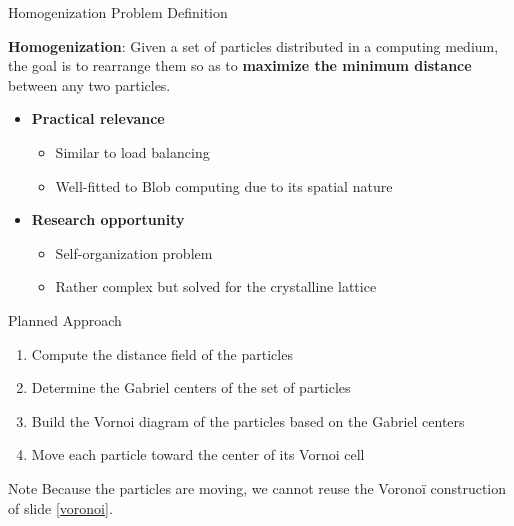 \documentclass{beamer}
\begin{document}
\begin{frame}{Homogenization Problem Definition}
    \begin{definition}
        \textbf{Homogenization}: Given a set of particles distributed in a computing medium, the goal is to rearrange them so as to \textbf{maximize the minimum distance} between any two particles.
    \end{definition}

    \begin{itemize}
        \item \textbf{Practical relevance}
            \begin{itemize}
                \item Similar to load balancing
                \item Well-fitted to Blob computing due to its spatial nature
            \end{itemize}
        
        \item \textbf{Research opportunity}
            \begin{itemize}
                \item Self-organization problem
                \item Rather complex but solved for the crystalline lattice
            \end{itemize}
    \end{itemize}
\end{frame}

\begin{frame}{Planned Approach}
    \begin{enumerate}
        \item Compute the distance field of the particles
        \item Determine the Gabriel centers of the set of particles
        \item Build the Vornoi diagram of the particles based on the Gabriel centers
        \item Move each particle toward the center of its Vornoi cell
    \end{enumerate}

    \vfill

    \begin{block}{Note}
        Because the particles are moving, we cannot reuse the Voronoï construction of slide \ref{voronoi}.
    \end{block}
\end{frame}
\end{document}

